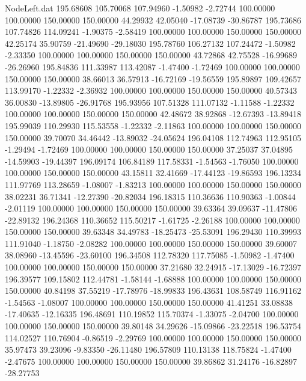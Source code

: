 \begin{filecontents}{NodeLeft.dat}
 195.68608  105.70068  107.94960    -1.50982   -2.72744  100.00000  100.00000  150.00000  150.00000   44.29932   42.05040  -17.08739  -30.86787
 195.73686  107.74826  114.09241    -1.90375   -2.58419  100.00000  100.00000  150.00000  150.00000   42.25174   35.90759  -21.49690  -29.18030
 195.78760  106.27132  107.24472    -1.50982   -2.33350  100.00000  100.00000  150.00000  150.00000   43.72868   42.75528  -16.99689  -26.26960
 195.84836  111.33987  113.42087    -1.47400   -1.72469  100.00000  100.00000  150.00000  150.00000   38.66013   36.57913  -16.72169  -19.56559
 195.89897  109.42657  113.99170    -1.22332   -2.36932  100.00000  100.00000  150.00000  150.00000   40.57343   36.00830  -13.89805  -26.91768
 195.93956  107.51328  111.07132    -1.11588   -1.22332  100.00000  100.00000  150.00000  150.00000   42.48672   38.92868  -12.67393  -13.89418
 195.99039  110.29930  115.53558    -1.22332   -2.11863  100.00000  100.00000  150.00000  150.00000   39.70070   34.46442  -13.89032  -24.05624
 196.04108  112.74963  112.95105    -1.29494   -1.72469  100.00000  100.00000  150.00000  150.00000   37.25037   37.04895  -14.59903  -19.44397
 196.09174  106.84189  117.58331    -1.54563   -1.76050  100.00000  100.00000  150.00000  150.00000   43.15811   32.41669  -17.44123  -19.86593
 196.13234  111.97769  113.28659    -1.08007   -1.83213  100.00000  100.00000  150.00000  150.00000   38.02231   36.71341  -12.27390  -20.82034
 196.18315  110.36636  110.90363    -1.00844   -2.01119  100.00000  100.00000  150.00000  150.00000   39.63364   39.09637  -11.47806  -22.89132
 196.24368  110.36652  115.50217    -1.61725   -2.26188  100.00000  100.00000  150.00000  150.00000   39.63348   34.49783  -18.25473  -25.53091
 196.29430  110.39993  111.91040    -1.18750   -2.08282  100.00000  100.00000  150.00000  150.00000   39.60007   38.08960  -13.45596  -23.60100
 196.34508  112.78320  117.75085    -1.50982   -1.47400  100.00000  100.00000  150.00000  150.00000   37.21680   32.24915  -17.13029  -16.72397
 196.39577  109.15802  112.44781    -1.58144   -1.68888  100.00000  100.00000  150.00000  150.00000   40.84198   37.55219  -17.78976  -18.99833
 196.43631  108.58749  116.91162    -1.54563   -1.08007  100.00000  100.00000  150.00000  150.00000   41.41251   33.08838  -17.40635  -12.16335
 196.48691  110.19852  115.70374    -1.33075   -2.04700  100.00000  100.00000  150.00000  150.00000   39.80148   34.29626  -15.09866  -23.22518
 196.53754  114.02527  110.76904    -0.86519   -2.29769  100.00000  100.00000  150.00000  150.00000   35.97473   39.23096   -9.83350  -26.11480
 196.57809  110.13138  118.75824    -1.47400   -2.47675  100.00000  100.00000  150.00000  150.00000   39.86862   31.24176  -16.82897  -28.27753

\end{filecontents}
